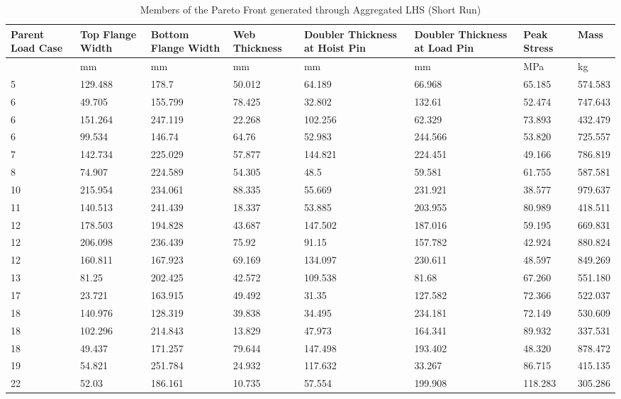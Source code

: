 \begin{table}[!htbp]
\small
\begin{tabular}{|p{1.5cm}p{1.5cm}p{1.5cm}p{1.4cm}p{2cm}p{2cm}p{1.5cm}p{1.5cm}|}
\hline
Parent Load Case&Top Flange Width&Bottom Flange Width&Web Thickness&Doubler Thickness at Hoist Pin&Doubler Thickness at Load Pin&Peak Stress& Mass\\
\hline
&mm&mm&mm&mm&mm&MPa&kg\\
\hline
5&129.488&178.7&50.012&64.189&66.968&65.185&574.583\\
6&49.705&155.799&78.425&32.802&132.61&52.474&747.643\\
6&151.264&247.119&22.268&102.256&62.329&73.893&432.479\\
6&99.534&146.74&64.76&52.983&244.566&53.820&725.557\\
7&142.734&225.029&57.877&144.821&224.451&49.166&786.819\\
8&74.907&224.589&54.305&48.5&59.581&61.755&587.581\\
10&215.954&234.061&88.335&55.669&231.921&38.577&979.637\\
11&140.513&241.439&18.337&53.885&203.955&80.989&418.511\\
12&178.503&194.828&43.687&147.502&187.016&59.195&669.831\\
12&206.098&236.439&75.92&91.15&157.782&42.924&880.824\\
12&160.811&167.923&69.169&134.097&230.611&48.597&849.269\\
13&81.25&202.425&42.572&109.538&81.68&67.260&551.180\\
17&23.721&163.915&49.492&31.35&127.582&72.366&522.037\\
18&140.976&128.319&39.838&34.495&234.181&72.149&530.609\\
18&102.296&214.843&13.829&47.973&164.341&89.932&337.531\\
18&49.437&171.257&79.644&147.498&193.402&48.320&878.472\\
19&54.821&251.784&24.932&117.632&33.267&86.715&415.135\\
22&52.03&186.161&10.735&57.554&199.908&118.283&305.286\\
\hline
\end{tabular}
\caption{Members of the Pareto Front generated through Aggregated LHS (Short Run)}
\label{tab:pfront_agg_short}
\end{table}

